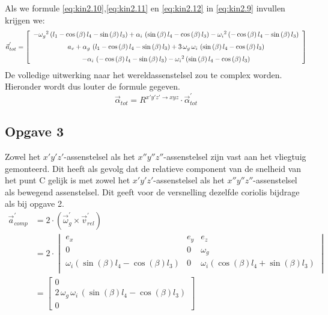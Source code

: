 Als we formule \eqref{eq:kin2.10},\eqref{eq:kin2.11} en \eqref{eq:kin2.12} in \eqref{eq:kin2.9} invullen krijgen we:
\begin{equation}
\vec{a}_{tot}^{'}=\left[ \begin {array}{c} -{\omega_{g}}^{2} \left( l_{1}-\cos \left( 
\beta \right) l_{4}-\sin \left( \beta \right) l_{3} \right) +\alpha_{i
}\, \left( \sin \left( \beta \right) l_{4}-\cos \left( \beta \right) l
_{3} \right) -{\omega_{i}}^{2} \left( -\cos \left( \beta \right) l_{4}
-\sin \left( \beta \right) l_{3} \right) \\ \noalign{\medskip}a_{v}+
\alpha_{g}\, \left( l_{1}-\cos \left( \beta \right) l_{4}-\sin \left( 
\beta \right) l_{3} \right) +3\,\omega_{g}\,\omega_{i}\, \left( \sin
 \left( \beta \right) l_{4}-\cos \left( \beta \right) l_{3} \right) 
\\ \noalign{\medskip}-\alpha_{i}\, \left( -\cos \left( \beta \right) l
_{4}-\sin \left( \beta \right) l_{3} \right) -{\omega_{i}}^{2} \left( 
\sin \left( \beta \right) l_{4}-\cos \left( \beta \right) l_{3}
 \right) \end {array} \right]
\label{eq:kin2.15}
\end{equation}
De volledige uitwerking naar het wereldassenstelsel zou te complex worden. Hieronder wordt dus louter de formule gegeven.
\begin{equation}
\vec{\alpha}_{tot}=R^{x'y'z' \rightarrow xyz}\cdot\vec{\alpha}_{tot}^{'}
\end{equation}
\newpage
\subsection{Opgave 3}
Zowel het $x'y'z'$-assenstelsel als het $x''y''z''$-assenstelsel zijn vast aan het vliegtuig gemonteerd. Dit heeft als gevolg dat de relatieve component van de snelheid van het punt C gelijk is met zowel het $x'y'z'$-assenstelsel als het $x''y''z''$-assenstelsel als bewegend assenstelsel. Dit geeft voor de versnelling dezelfde coriolis bijdrage als bij opgave 2.
\begin{equation}
\begin{split}
\vec{a}_{comp}^{'}&=2\cdot(\vec{\omega}_{g}^{'}\times\vec{v}_{rel}^{'})\\
&=2\cdot
\begin{vmatrix}
e_{x}&e_{y}&e_{z}\\
0&0&\omega_{g}\\
\omega_{i}(\sin(\beta)l_{4}-\cos(\beta)l_{3})&0&\omega_{i}(\cos(\beta)l_{4}+\sin(\beta)l_{3})\\
\end{vmatrix}\\
&=\left[ \begin {array}{c} 0\\2\,\omega_{g}\,\omega_
{i}\, \left( \sin \left( \beta \right) l_{4}-\cos \left( \beta
 \right) l_{3} \right) \\ 0\end {array} \right]
\end{split}
\label{eq:kin3.1}
\end{equation}
